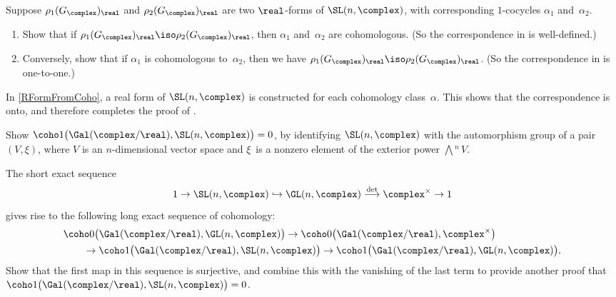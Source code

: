 \begin{exercises}


\item \label{RFormsG=CohoEx}
Suppose $\rho_1(G_\complex)_\real$ and $\rho_2(G_\complex)_\real$ are two $\real$-forms of $\SL(n,\complex)$, with corresponding $1$-cocycles $\alpha_1$ and~$\alpha_2$.
	\begin{enumerate}
	\item \label{RFormsG=CohoEx-well}
	Show that if $\rho_1(G_\complex)_\real \iso \rho_2(G_\complex)_\real$, then $\alpha_1$ and~$\alpha_2$ are cohomologous.
	(So the correspondence in  is well-defined.) 
	\item Conversely, show that if $\alpha_1$ is cohomologous to~$\alpha_2$, then we have $\rho_1(G_\complex)_\real \iso \rho_2(G_\complex)_\real$.
	(So the correspondence in  is one-to-one.) 
	\end{enumerate}
In \cref{RFormFromCoho}, a real form of $\SL(n,\complex)$ is constructed for each cohomology class~$\alpha$. This shows that the correspondence is onto, and therefore completes the proof of .

\item \label{H1SL=0Ex}
Show $\coho1\bigl( \Gal(\complex/\real),  \SL(n,\complex) \bigr) = 0$, by identifying $\SL(n,\complex)$ with the automorphism group of a pair $(V,\xi)$, where $V$ is an $n$-dimensional vector space and $\xi$~is a nonzero element of the exterior power ${\bigwedge}\!^n \, V$.

\item The short exact sequence
	$$ 1 \to \SL(n,\complex) \hookrightarrow \GL(n,\complex) \stackrel{\det}{\longrightarrow} \complex^\times \to 1 $$
gives rise to the following long exact sequence of cohomology:
	\begin{align*}
	&\coho0\bigl( \Gal(\complex/\real), \GL(n,\complex) \bigr)
	\to \coho0\bigl( \Gal(\complex/\real),  \complex^\times \bigr)
	\\&\qquad \to \coho1\bigl( \Gal(\complex/\real),  \SL(n,\complex) \bigr)
	\to \coho1\bigl( \Gal(\complex/\real),  \GL(n,\complex) \bigr) 
	. \end{align*}
Show that the first map in this sequence is surjective, and combine this with the vanishing of the last term to provide another proof that $\coho1\bigl( \Gal(\complex/\real),  \SL(n,\complex) \bigr) = 0$.


\end{exercises}

